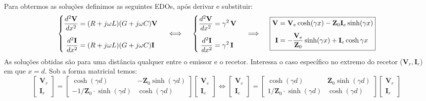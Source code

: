 Para obtermos as soluções definimos as seguintes EDOs, após derivar e substituir:
$$
    \left\{
    \begin{aligned}
        \frac{d^2 \mathbf{V}}{dx^2} &= (R + j\omega L)(G + j\omega C) \mathbf{V} \\[6pt]
        \frac{d^2 \mathbf{I}}{dx^2} &= (R + j\omega L)(G + j\omega C) \mathbf{I}
    \end{aligned}\right.
    \quad\iff\quad
    \left\{
    \begin{aligned}
        \frac{d^2 \mathbf{V}}{dx^2} &= \gamma^2\, \mathbf{V} \\[6pt]
        \frac{d^2 \mathbf{I}}{dx^2} &= \gamma^2\, \mathbf{I}
    \end{aligned}\right.
    \quad\implies\quad
    \boxed{%
    \begin{aligned}
        \mathbf{V} &= \mathbf{V}_e \cosh(\gamma x) - \mathbf{Z}_0 \mathbf{I}_e \sinh(\gamma x) \\[4pt]
        \mathbf{I} &= -\frac{\mathbf{V}_e}{\mathbf{Z}_0} \sinh(\gamma x) + \mathbf{I}_e \cosh{\gamma x}
    \end{aligned}}
$$
As soluções obtidas são para uma distância qualquer entre o emissor e o recetor. Interessa o caso específico no extremo do recetor ($\mathbf{V}_r, \mathbf{I}_r$) em que $x = d$. Sob a forma matricial temos:
$$
    \begin{bmatrix}
        \mathbf{V}_r \\[6pt]
        \mathbf{I}_r
    \end{bmatrix}
    =
    \begin{bmatrix}
        \cosh(\gamma d) & -\mathbf{Z}_0 \sinh(\gamma d) \\[6pt]
        -1/\mathbf{Z}_0 \cdot \sinh(\gamma d) & \cosh(\gamma d)
    \end{bmatrix}
    \begin{bmatrix}
        \mathbf{V}_e \\[6pt]
        \mathbf{I}_e
    \end{bmatrix}
    \iff 
    \begin{bmatrix}
        \mathbf{V}_e \\[6pt]
        \mathbf{I}_e
    \end{bmatrix}
    =
    \begin{bmatrix}
        \cosh(\gamma d) & \mathbf{Z}_0 \sinh(\gamma d) \\[6pt]
        1/\mathbf{Z}_0 \cdot \sinh(\gamma d) & \cosh(\gamma d)
    \end{bmatrix}
    \begin{bmatrix}
        \mathbf{V}_r \\[6pt]
        \mathbf{I}_r
    \end{bmatrix}
$$
